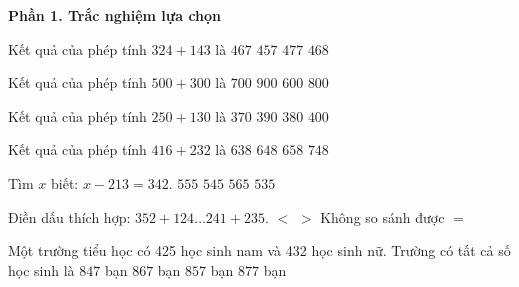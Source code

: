 \textbf{Phần 1. Trắc nghiệm lựa chọn}

\begin{ex} %
Kết quả của phép tính $324 + 143$ là
\choice
{\True $467$}
{$457$}
{$477$}
{$468$}
\end{ex}

\begin{ex} %
Kết quả của phép tính $500 + 300$ là
\choice
{$700$}
{$900$}
{$600$}
{\True $800$}
\end{ex}

\begin{ex} %
Kết quả của phép tính $250 + 130$ là
\choice
{$370$}
{$390$}
{\True $380$}
{$400$}
\end{ex}

\begin{ex} %
Kết quả của phép tính $416 + 232$ là
\choice
{$638$}
{\True $648$}
{$658$}
{$748$}
\end{ex}

\begin{ex} %
Tìm $x$ biết: $x - 213 = 342$.
\choice
{\True $555$}
{$545$}
{$565$}
{$535$}
\end{ex}

\begin{ex} %
Điền dấu thích hợp: $352 + 124 \dots 241 + 235$.
\choice
{$<$}
{$>$}
{Không so sánh được}
{\True $=$}
\end{ex}

\begin{ex} %
Một trường tiểu học có 425 học sinh nam và 432 học sinh nữ. Trường có tất cả số học sinh là
\choice
{$847$ bạn}
{$867$ bạn}
{\True $857$ bạn}
{$877$ bạn}
\end{ex}

